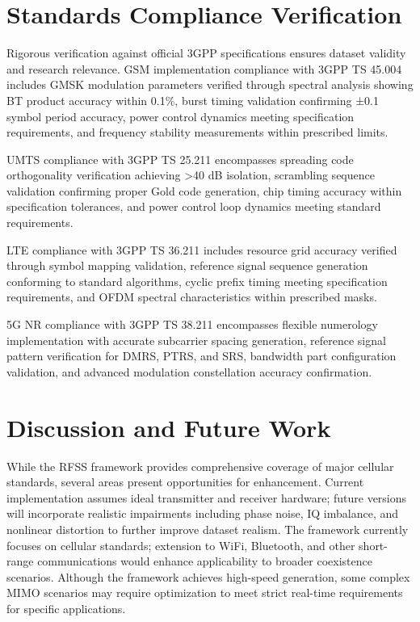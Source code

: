 \documentclass[twocolumn,10pt]{article}
\begin{document}
\section{Standards Compliance Verification}

Rigorous verification against official 3GPP specifications ensures dataset validity and research relevance. GSM implementation compliance with 3GPP TS 45.004 includes GMSK modulation parameters verified through spectral analysis showing BT product accuracy within 0.1\%, burst timing validation confirming ±0.1 symbol period accuracy, power control dynamics meeting specification requirements, and frequency stability measurements within prescribed limits.

UMTS compliance with 3GPP TS 25.211 encompasses spreading code orthogonality verification achieving >40 dB isolation, scrambling sequence validation confirming proper Gold code generation, chip timing accuracy within specification tolerances, and power control loop dynamics meeting standard requirements.

LTE compliance with 3GPP TS 36.211 includes resource grid accuracy verified through symbol mapping validation, reference signal sequence generation conforming to standard algorithms, cyclic prefix timing meeting specification requirements, and OFDM spectral characteristics within prescribed masks.

5G NR compliance with 3GPP TS 38.211 encompasses flexible numerology implementation with accurate subcarrier spacing generation, reference signal pattern verification for DMRS, PTRS, and SRS, bandwidth part configuration validation, and advanced modulation constellation accuracy confirmation.

\section{Discussion and Future Work}

While the RFSS framework provides comprehensive coverage of major cellular standards, several areas present opportunities for enhancement. Current implementation assumes ideal transmitter and receiver hardware; future versions will incorporate realistic impairments including phase noise, IQ imbalance, and nonlinear distortion to further improve dataset realism. The framework currently focuses on cellular standards; extension to WiFi, Bluetooth, and other short-range communications would enhance applicability to broader coexistence scenarios. Although the framework achieves high-speed generation, some complex MIMO scenarios may require optimization to meet strict real-time requirements for specific applications.
\end{document}

